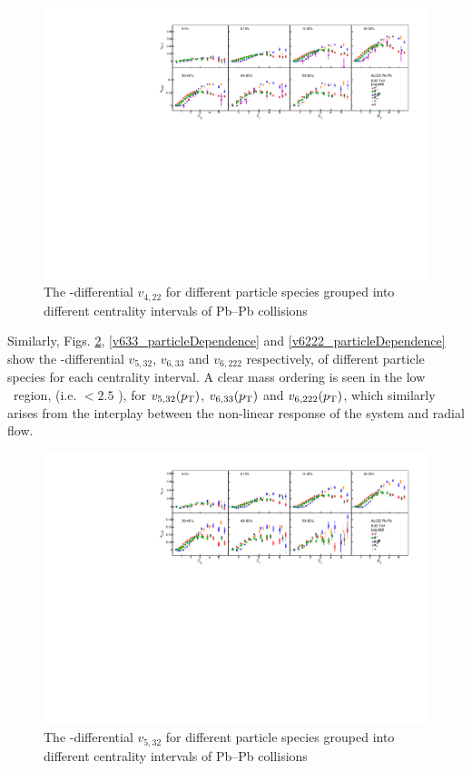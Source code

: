 \begin{figure}[!htb]
\begin{center}
\includegraphics[scale=0.82]{figures/results/All_v422_gap00.pdf}
\end{center}
\caption{The \pT-differential $v_{4,22}$ for different particle species grouped into different centrality intervals of Pb--Pb collisions \sNN}
\label{v422_particleDependence}
\end{figure}

Similarly, Figs. \ref{v523_particleDependence}, \ref{v633_particleDependence} and \ref{v6222_particleDependence} show the \pT-differential $v_{5,32}$, $v_{6,33}$ and $v_{6,222}$ respectively, of different particle species for each centrality interval. A clear mass ordering is seen in the low \pT~region, (i.e. \pT $< 2.5$ \GeV), for $v_{5,32}(p_{\rm{T}})$, $v_{6,33}(p_{\rm{T}})$ and $v_{6,222}(p_{\rm{T}})$, which similarly arises from the interplay between the non-linear response of the system and radial flow. 

\begin{figure}[!htb]
\begin{center}
\includegraphics[scale=0.82]{figures/results/All_v523_gap00.pdf}
\end{center}
\caption{The \pT-differential $v_{5,32}$ for different particle species grouped into different centrality intervals of Pb--Pb collisions \sNN}
\label{v523_particleDependence}
\end{figure}

